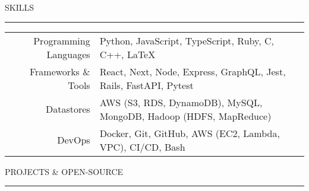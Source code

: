 \documentclass[9pt]{extarticle}
\begin{document}
\vspace{5pt}

\begin{adjustwidth}{4pt}{4pt} SKILLS \end{adjustwidth}
\rule[8pt]{\linewidth}{0.4pt}

\begin{adjustwidth}{14pt}{14pt}
	\vspace{-5pt}

	\begin{tabular}{ r l }
	 	\textcolor{imptextblack}{Programming Languages} & Python, JavaScript, TypeScript, Ruby, C, C++, \LaTeX \\ 
	 	\textcolor{imptextblack}{Frameworks \& Tools} & React, Next, Node, Express, GraphQL, Jest, Rails, FastAPI, Pytest \\  
	 	\textcolor{imptextblack}{Datastores} & AWS (S3, RDS, DynamoDB), MySQL, MongoDB, Hadoop (HDFS, MapReduce) \\  
	 	\textcolor{imptextblack}{DevOps} & Docker, Git, GitHub, AWS (EC2, Lambda, VPC), CI/CD, Bash \\  
	\end{tabular}
\end{adjustwidth}

\vspace{5pt}

\begin{adjustwidth}{4pt}{4pt} PROJECTS \& OPEN-SOURCE \end{adjustwidth}
\rule[8pt]{\linewidth}{0.4pt}
\end{document}
